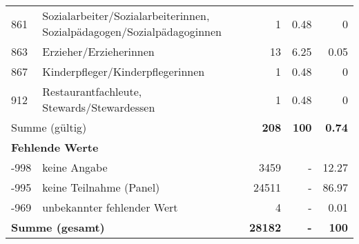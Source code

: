 \begin{longtable}{lXrrr}
        861 & \multicolumn{1}{X}{Sozialarbeiter/Sozialarbeiterinnen, Sozialpädagogen/Sozialpädagoginnen} & %
          \num{1} &
          \num[round-mode=places,round-precision=2]{0,48} &
          \num[round-mode=places,round-precision=2]{0} \\

        863 & \multicolumn{1}{X}{Erzieher/Erzieherinnen} & %
          \num{13} &
          \num[round-mode=places,round-precision=2]{6,25} &
          \num[round-mode=places,round-precision=2]{0,05} \\

        867 & \multicolumn{1}{X}{Kinderpfleger/Kinderpflegerinnen} & %
          \num{1} &
          \num[round-mode=places,round-precision=2]{0,48} &
          \num[round-mode=places,round-precision=2]{0} \\

        912 & \multicolumn{1}{X}{Restaurantfachleute, Stewards/Stewardessen} & %
          \num{1} &
          \num[round-mode=places,round-precision=2]{0,48} &
          \num[round-mode=places,round-precision=2]{0} \\

     \midrule
     \multicolumn{2}{l}{Summe (gültig)} &
       \textbf{\num{208}} &
     \textbf{100} &
       \textbf{\num[round-mode=places,round-precision=2]{0,74}} \\
     \multicolumn{5}{l}{\textbf{Fehlende Werte}}\\
       -998 &
       keine Angabe &
         \num{3459} &
        - &
         \num[round-mode=places,round-precision=2]{12,27} \\
       -995 &
       keine Teilnahme (Panel) &
         \num{24511} &
        - &
         \num[round-mode=places,round-precision=2]{86,97} \\
       -969 &
       unbekannter fehlender Wert &
         \num{4} &
        - &
         \num[round-mode=places,round-precision=2]{0,01} \\
     \midrule
     \multicolumn{2}{l}{\textbf{Summe (gesamt)}} &
          \textbf{\num{28182}} &
        \textbf{-} &
        \textbf{100} \\
     \bottomrule
     \end{longtable}
     

